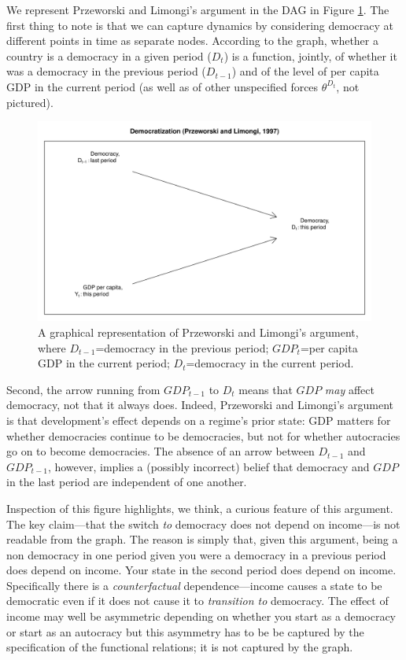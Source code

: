 \documentclass[
  12pt,
]{book}
\begin{document}
We represent Przeworski and Limongi's argument in the DAG in Figure \ref{fig:DAGPL}. The first thing to note is that we can capture dynamics by considering democracy at different points in time as separate nodes. According to the graph, whether a country is a democracy in a given period (\(D_t\)) is a function, jointly, of whether it was a democracy in the previous period (\(D_{t-1}\)) and of the level of per capita GDP in the current period (as well as of other unspecified forces \(\theta^{D_t}\), not pictured).

\begin{figure}

{\centering \includegraphics[width=.7\textwidth]{ii_files/figure-latex/DAGPL-1} 

}

\caption{A graphical representation of Przeworski and Limongi's argument, where $D_{t-1}$=democracy in the previous period; $GDP_t$=per capita GDP in the current period; $D_t$=democracy in the current period.}\label{fig:DAGPL}
\end{figure}

Second, the arrow running from \(GDP_{t-1}\) to \(D_t\) means that \(GDP\) \emph{may} affect democracy, not that it always does. Indeed, Przeworski and Limongi's argument is that development's effect depends on a regime's prior state: GDP matters for whether democracies continue to be democracies, but not for whether autocracies go on to become democracies. The absence of an arrow between \(D_{t-1}\) and \(GDP_{t-1}\), however, implies a (possibly incorrect) belief that democracy and \(GDP\) in the last period are independent of one another.

Inspection of this figure highlights, we think, a curious feature of this argument. The key claim---that the switch \emph{to} democracy does not depend on income---is not readable from the graph. The reason is simply that, given this argument, being a non democracy in one period given you were a democracy in a previous period does depend on income. Your state in the second period does depend on income. Specifically there is a \emph{counterfactual} dependence---income causes a state to be democratic even if it does not cause it to \emph{transition to} democracy. The effect of income may well be asymmetric depending on whether you start as a democracy or start as an autocracy but this asymmetry has to be be captured by the specification of the functional relations; it is not captured by the graph.
\end{document}
